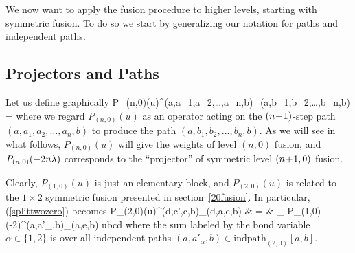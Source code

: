We now want to apply the fusion procedure to higher levels,
starting with symmetric fusion.
To do so we start by generalizing our notation for
paths and independent paths.

\subsection{Projectors and Paths}
\label{PN}

Let us define graphically
\be
P_{(n,0)}(u)^{(a,a_1,a_2,\ldots,a_n,b)}_{(a,b_1,b_2,\ldots,b_n,b)}
\;\;\;\; = \proj
\label{projdef}
\ee
where we regard $P_{(n,0)}(u)$ as an operator acting on the
$(n\!+\!1)$-step path  $(a,a_1,a_2,\ldots,a_n,b)$ to produce the path
$(a,b_1,b_2,\ldots,b_n,b)$.
As we will see in what follows, $P_{(n,0)}(u)$ will give
the weights of level $(n,0)$ fusion,
and $P_{(n,0)}(-2n\lambda)$ corresponds to the ``projector'' of
symmetric level $(n\!+\!1,0)$ fusion.

Clearly, $P_{(1,0)}(u)$ is just an elementary block, and $P_{(2,0)}(u)$
is related to the $1\times 2$ symmetric fusion presented in
section~\ref{20fusion}. In particular, (\ref{splittwozero})
becomes
\be
P_{(2,0)}(u)^{(d,c',c,b)}_{(d,a,e,b)} & = &
\sum_{\alpha}\; P_{(1,0)}(-2\la)^{(a,a'_{\alpha},b)}_{(a,e,b)}\;
ubcd{\alpha}{}{\beta}{\vspace*{-3mm}}
\ee
where the sum labeled by the bond variable $\alpha\in\{1,2\}$
is over all independent paths
\mbox{$(a,a'_{\alpha},b)\in\mbox{indpath}_{(2,0)}[a,b]$}.

